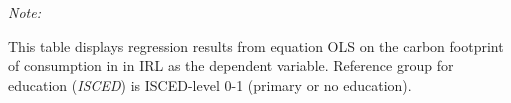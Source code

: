 \begin{table}[htbp!]
\begin{adjustbox}{width = 1\textwidth, max height = 0.95\textheight, center}
\begin{threeparttable}[b]
         \begin{tablenotes}\item \medskip \textit{Note:}
            \item This table displays regression results from equation OLS on the carbon footprint of consumption in  in IRL as the dependent variable.  Reference group for education (\textit{ISCED}) is ISCED-level 0-1 (primary or no education).
         \end{tablenotes}
      \end{threeparttable}
   \end{adjustbox}
\end{table}


